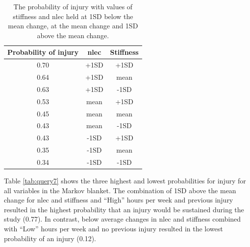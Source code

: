 \documentclass[
  english,
  man,floatsintext]{apa6}
\begin{document}
\begin{table}[H]

\begin{center}
\begin{threeparttable}

\caption{\label{tab:query6}The probability of injury with values of stiffness and nlec held at 1SD below the mean change, at the mean change and 1SD above the mean change.}

\begin{tabular}{ccc}
\toprule
Probability of injury & nlec & Stiffness\\
\midrule
0.70 & +1SD & +1SD\\
0.64 & +1SD & mean\\
0.63 & +1SD & -1SD\\
0.53 & mean & +1SD\\
0.45 & mean & mean\\
0.43 & mean & -1SD\\
0.43 & -1SD & +1SD\\
0.35 & -1SD & mean\\
0.34 & -1SD & -1SD\\
\bottomrule
\end{tabular}

\end{threeparttable}
\end{center}

\end{table}

Table \ref{tab:query7} shows the three highest and lowest probabilities for injury for all variables in the Markov blanket.
The combination of 1SD above the mean change for nlec and stiffness and \enquote{High} hours per week and previous injury resulted in the highest probability that an injury would be sustained during the study (0.77).
In contrast, below average changes in nlec and stiffness combined with \enquote{Low} hours per week and no previous injury resulted in the lowest probability of an injury (0.12).
\end{document}
